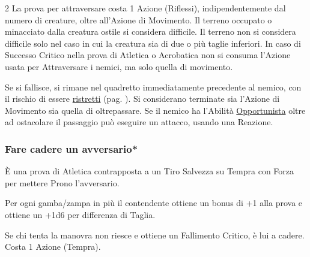 \begin{multicols}{2}
La prova per attraversare costa 1 Azione (Riflessi), indipendentemente dal numero di creature, oltre all'Azione di Movimento. Il terreno occupato o minacciato dalla creatura ostile si considera difficile. Il terreno non si considera difficile solo nel caso in cui la creatura sia di due o più taglie inferiori. In caso di Successo Critico nella prova di Atletica o Acrobatica non si consuma l'Azione usata per Attraversare i nemici, ma solo quella di movimento.

Se si fallisce, si rimane nel quadretto immediatamente precedente al nemico, con il rischio di essere \hyperlink{ristretti}{ristretti} (pag. \pageref{ristretti}). Si considerano terminate sia l'Azione di Movimento sia quella di oltrepassare.
Se il nemico ha l'Abilità \hyperlink{Opportunista}{Opportunista} oltre ad ostacolare il passaggio può eseguire un attacco, usando una Reazione.

%

\subsubsection{Fare cadere un avversario*} \label{farecadereavversario}\hypertarget{farecadereavversario}{}

È una prova di Atletica contrapposta a un Tiro Salvezza su Tempra con Forza per mettere Prono l'avversario.

Per ogni gamba/zampa in più il contendente ottiene un bonus di +1 alla prova e ottiene un +1d6 per differenza di Taglia.

Se chi tenta la manovra non riesce e ottiene un Fallimento Critico, è lui a cadere. Costa 1 Azione (Tempra).





\end{multicols}
